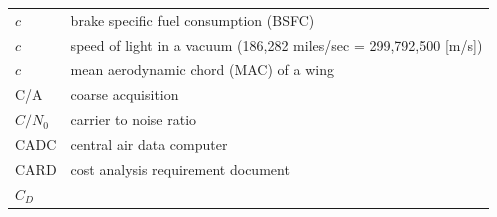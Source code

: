 \documentclass[
]{book}
\begin{document}
\begin{longtable}[]{@{}ll@{}}
\begin{minipage}[t]{0.47\columnwidth}
\(c\)\strut
\end{minipage} & \begin{minipage}[t]{0.47\columnwidth}\raggedright
brake specific fuel consumption (BSFC)\strut
\end{minipage}\tabularnewline
\begin{minipage}[t]{0.47\columnwidth}\raggedright
\(c\)\strut
\end{minipage} & \begin{minipage}[t]{0.47\columnwidth}\raggedright
speed of light in a vacuum (186,282 miles/sec = 299,792,500 {[}m/s{]})\strut
\end{minipage}\tabularnewline
\begin{minipage}[t]{0.47\columnwidth}\raggedright
\(c\)\strut
\end{minipage} & \begin{minipage}[t]{0.47\columnwidth}\raggedright
mean aerodynamic chord (MAC) of a wing\strut
\end{minipage}\tabularnewline
\begin{minipage}[t]{0.47\columnwidth}\raggedright
C/A\strut
\end{minipage} & \begin{minipage}[t]{0.47\columnwidth}\raggedright
coarse acquisition\strut
\end{minipage}\tabularnewline
\begin{minipage}[t]{0.47\columnwidth}\raggedright
\(C/N_0\)\strut
\end{minipage} & \begin{minipage}[t]{0.47\columnwidth}\raggedright
carrier to noise ratio\strut
\end{minipage}\tabularnewline
\begin{minipage}[t]{0.47\columnwidth}\raggedright
CADC\strut
\end{minipage} & \begin{minipage}[t]{0.47\columnwidth}\raggedright
central air data computer\strut
\end{minipage}\tabularnewline
\begin{minipage}[t]{0.47\columnwidth}\raggedright
CARD\strut
\end{minipage} & \begin{minipage}[t]{0.47\columnwidth}\raggedright
cost analysis requirement document\strut
\end{minipage}\tabularnewline
\begin{minipage}[t]{0.47\columnwidth}\raggedright
\(C_D\)\strut
\end{minipage} & \begin{minipage}[t]{0.47\columnwidth}\raggedright

\end{minipage}
\end{longtable}
\end{document}
